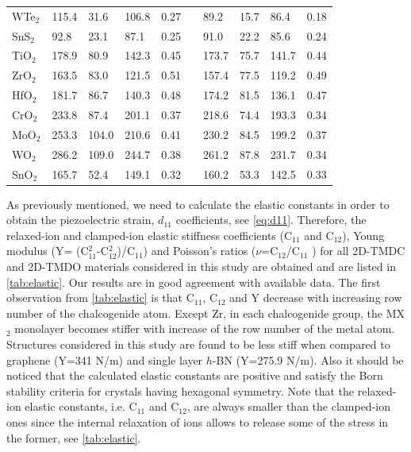 \begin{table}[htbp]
\begin{tabularx}{\linewidth}{lXXXXsXXXX}
WTe$_2$ & 115.4 &  31.6 & 106.8 & 0.27 &&  89.2 & 15.7 &  86.4 & 0.18\\
SnS$_2$ &  92.8 &  23.1 &  87.1 & 0.25 &&  91.0 & 22.2 &  85.6 & 0.24\\
TiO$_2$ & 178.9 &  80.9 & 142.3 & 0.45 && 173.7 & 75.7 & 141.7 & 0.44\\
ZrO$_2$ & 163.5 &  83.0 & 121.5 & 0.51 && 157.4 & 77.5 & 119.2 & 0.49\\
HfO$_2$ & 181.7 &  86.7 & 140.3 & 0.48 && 174.2 & 81.5 & 136.1 & 0.47\\
CrO$_2$ & 233.8 &  87.4 & 201.1 & 0.37 && 218.6 & 74.4 & 193.3 & 0.34\\
MoO$_2$ & 253.3 & 104.0 & 210.6 & 0.41 && 230.2 & 84.5 & 199.2 & 0.37\\
WO$_2$  & 286.2 & 109.0 & 244.7 & 0.38 && 261.2 & 87.8 & 231.7 & 0.34\\
SnO$_2$ & 165.7 &  52.4 & 149.1 & 0.32 && 160.2 & 53.3 & 142.5 & 0.33\\
\hline\hline
\end{tabularx}
\end{table}

As previously mentioned, we need to calculate the elastic constants in order to obtain the piezoelectric strain, $d_{11}$ coefficients, see \autoref{eq:d11}. Therefore, the relaxed-ion and clamped-ion elastic stiffness coefficients (C$_{11}$ and C$_{12}$), Young modulus (Y= (C$_{11}^2$-C$_{12}^2$)/C$_{11}$) and Poisson's ratios ($\nu$=C$_{12}$/C$_{11}$ ) for all 2D-TMDC and 2D-TMDO materials considered in this study are obtained and are listed in \autoref{tab:elastic}. Our results are in good agreement with available data\cite{Peng2013,Kang2013,Duerloo2012,Cooper2013}. The first observation from \autoref{tab:elastic} is that C$_{11}$, C$_{12}$ and Y decrease with increasing row number of the chalcogenide atom. Except Zr, in each chalcogenide group, the MX$_2$ monolayer becomes stiffer with increase of the row number of the metal atom. Structures considered in this study are found to be less stiff when compared to graphene (Y=341 N/m)\cite{QHA2} and single layer $h$-BN (Y=275.9 N/m)\cite{QHA2}. Also it should be noticed that the calculated elastic constants are positive and satisfy the Born stability criteria for crystals having hexagonal symmetry\cite{nye1985physical,Born1998}.  Note that the relaxed-ion elastic constants, i.e. C$_{11}$ and C$_{12}$, are always smaller than the clamped-ion ones since the internal relaxation of ions allows to release some of the stress in the former, see \autoref{tab:elastic}.

